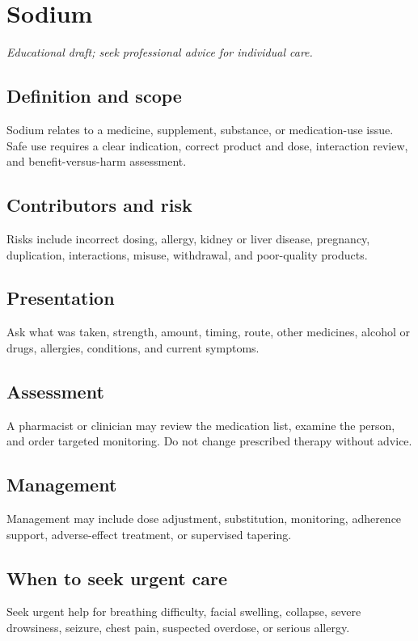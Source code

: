 \chapter{Sodium}
\medskip
\noindent\textit{Educational draft; seek professional advice for individual care.}

\section*{Definition and scope}
Sodium relates to a medicine, supplement, substance, or medication-use issue. Safe use requires a clear indication, correct product and dose, interaction review, and benefit-versus-harm assessment.

\section*{Contributors and risk}
Risks include incorrect dosing, allergy, kidney or liver disease, pregnancy, duplication, interactions, misuse, withdrawal, and poor-quality products.

\section*{Presentation}
Ask what was taken, strength, amount, timing, route, other medicines, alcohol or drugs, allergies, conditions, and current symptoms.

\section*{Assessment}
A pharmacist or clinician may review the medication list, examine the person, and order targeted monitoring. Do not change prescribed therapy without advice.

\section*{Management}
Management may include dose adjustment, substitution, monitoring, adherence support, adverse-effect treatment, or supervised tapering.

\section*{When to seek urgent care}
Seek urgent help for breathing difficulty, facial swelling, collapse, severe drowsiness, seizure, chest pain, suspected overdose, or serious allergy.

